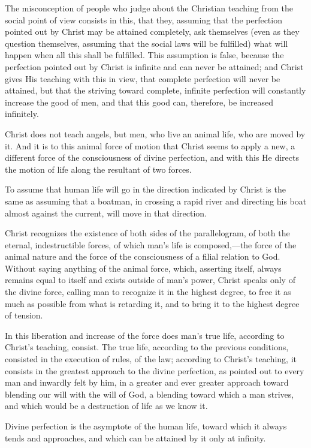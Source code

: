 \documentclass{book}
\begin{document}
The misconception of people who judge about the Christian teaching from the social point of view consists in this, that they, assuming that the perfection pointed out by Christ may be attained completely, ask themselves (even as they question themselves, assuming that the social laws will be fulfilled) what will happen when all this shall be fulfilled. This assumption is false, because the perfection pointed out by Christ is infinite and can never be attained; and Christ gives His teaching with this in view, that complete perfection will never be attained, but that the striving toward complete, infinite perfection will constantly increase the good of men, and that this good can, therefore, be increased infinitely.

Christ does not teach angels, but men, who live an animal life, who are moved by it. And it is to this animal force of motion that Christ seems to apply a new, a different force of the consciousness of divine perfection, and with this He directs the motion of life along the resultant of two forces.

To assume that human life will go in the direction indicated by Christ is the same as assuming that a boatman, in crossing a rapid river and directing his boat almost against the current, will move in that direction.

Christ recognizes the existence of both sides of the parallelogram, of both the eternal, indestructible forces, of which man’s life is composed,—the force of the animal nature and the force of the consciousness of a filial relation to God. Without saying anything of the animal force, which, asserting itself, always remains equal to itself and exists outside of man’s power, Christ speaks only of the divine force, calling man to recognize it in the highest degree, to free it as much as possible from what is retarding it, and to bring it to the highest degree of tension.

In this liberation and increase of the force does man’s true life, according to Christ’s teaching, consist. The true life, according to the previous conditions, consisted in the execution of rules, of the law; according to Christ’s teaching, it consists in the greatest approach to the divine perfection, as pointed out to every man and inwardly felt by him, in a greater and ever greater approach toward blending our will with the will of God, a blending toward which a man strives, and which would be a destruction of life as we know it.

Divine perfection is the asymptote of the human life, toward which it always tends and approaches, and which can be attained by it only at infinity.
\end{document}
